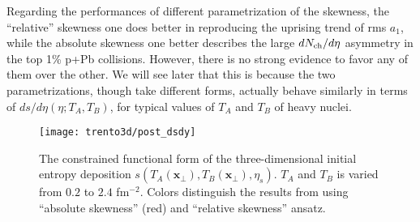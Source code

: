 Regarding the performances of different parametrization of the skewness, the ``relative'' skewness one does better in reproducing the uprising trend of rms $a_1$, while the absolute skewness one better describes the large $dN_\text{ch}/d\eta$ asymmetry in the top 1\% p+Pb collisions.
However, there is no strong evidence to favor any of them over the other.
We will see later that this is because the two parametrizations, though take different forms, actually behave similarly in terms of $ds/d\eta(\eta; T_A, T_B)$, for typical values of $T_A$ and $T_B$ of heavy nuclei.

\begin{figure}
\centering
\texttt{[image: trento3d/post\_dsdy]}
\caption{The constrained functional form of the three-dimensional initial entropy deposition $s(T_A(\mathbf{x}_\perp), T_B(\mathbf{x}_\perp), \eta_s)$. $T_A$ and $T_B$ is varied from $0.2$ to $2.4$ fm${}^{-2}$. Colors distinguish the results from using ``absolute skewness'' (red) and ``relative skewness'' ansatz.}
\label{fig:trento:post_dsdy}
\end{figure}

